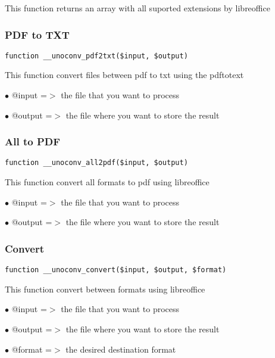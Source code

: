 \documentclass[a4paper]{article}
\begin{document}
This function returns an array with all suported extensions by libreoffice

\hypertarget{toc535}{}
\subsubsection{PDF to TXT}

\begin{lstlisting}
function __unoconv_pdf2txt($input, $output)
\end{lstlisting}

This function convert files between pdf to txt using the pdftotext

\begin{compactitem}
\item[\color{myblue}$\bullet$] @input  =$>$ the file that you want to process
\item[\color{myblue}$\bullet$] @output =$>$ the file where you want to store the result
\end{compactitem}

\hypertarget{toc536}{}
\subsubsection{All to PDF}

\begin{lstlisting}
function __unoconv_all2pdf($input, $output)
\end{lstlisting}

This function convert all formats to pdf using libreoffice

\begin{compactitem}
\item[\color{myblue}$\bullet$] @input  =$>$ the file that you want to process
\item[\color{myblue}$\bullet$] @output =$>$ the file where you want to store the result
\end{compactitem}

\hypertarget{toc537}{}
\subsubsection{Convert}

\begin{lstlisting}
function __unoconv_convert($input, $output, $format)
\end{lstlisting}

This function convert between formats using libreoffice

\begin{compactitem}
\item[\color{myblue}$\bullet$] @input  =$>$ the file that you want to process
\item[\color{myblue}$\bullet$] @output =$>$ the file where you want to store the result
\item[\color{myblue}$\bullet$] @format =$>$ the desired destination format
\end{compactitem}
\end{document}
